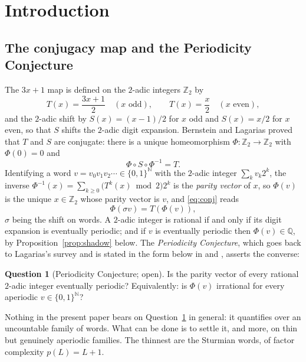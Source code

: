 \documentclass[11pt,reqno]{amsart}
\theoremstyle{plain}
\theoremstyle{definition}
\newtheorem{question}[theorem]{Question}
\newcommand{\N}{\mathbb{N}}
\newcommand{\Z}{\mathbb{Z}}
\newcommand{\Q}{\mathbb{Q}}
\newcommand{\Zt}{\Z_2}
\newcommand{\PH}{\Phi}
\begin{document}
\maketitle

\section{Introduction}\label{sec:intro}

\subsection{The conjugacy map and the Periodicity Conjecture}
The $3x+1$ map is defined on the $2$-adic integers $\Zt$ by
\[
T(x)=\frac{3x+1}{2}\quad(x\text{ odd}),\qquad T(x)=\frac{x}{2}\quad(x\text{ even}),
\]
and the $2$-adic shift by $S(x)=(x-1)/2$ for $x$ odd and $S(x)=x/2$ for $x$ even, so that $S$ shifts
the $2$-adic digit expansion. Bernstein and Lagarias \cite[\S1]{BL96} proved that $T$ and $S$ are
conjugate: there is a unique homeomorphism $\PH\colon\Zt\to\Zt$ with $\PH(0)=0$ and
\begin{equation}\label{eq:conj}
  \PH\circ S\circ\PH^{-1}=T .
\end{equation}
Identifying a word $v=v_0v_1v_2\cdots\in\{0,1\}^{\N}$ with the $2$-adic integer $\sum_k v_k2^k$, the
inverse $\PH^{-1}(x)=\sum_{k\ge0}\bigl(T^k(x)\bmod 2\bigr)2^k$ is the \emph{parity vector} of $x$,
so $\PH(v)$ is the unique $x\in\Zt$ whose parity vector is $v$, and \eqref{eq:conj} reads
\begin{equation}\label{eq:shift}
  \PH(\sigma v)=T(\PH(v)),
\end{equation}
$\sigma$ being the shift on words. A $2$-adic integer is rational if and only if its digit
expansion is eventually periodic; and if $v$ is eventually periodic then $\PH(v)\in\Q$, by
Proposition~\ref{prop:shadow} below. The \emph{Periodicity Conjecture}, which goes back to Lagarias's survey \cite{Lagarias85} and is
stated in the form below in \cite[Abstract]{LS09} and \cite[\S1]{LS21}, asserts the converse:

\begin{question}[Periodicity Conjecture; open]\label{q:per}
Is the parity vector of every rational $2$-adic integer eventually periodic? Equivalently: is
$\PH(v)$ irrational for every aperiodic $v\in\{0,1\}^{\N}$?
\end{question}

Nothing in the present paper bears on Question~\ref{q:per} in general: it quantifies over an
uncountable family of words. What can be done is to settle it, and more, on thin but genuinely
aperiodic families. The thinnest are the Sturmian words, of factor complexity $p(L)=L+1$.
\end{document}
